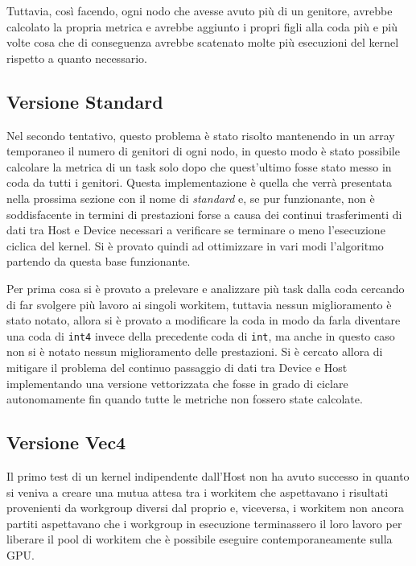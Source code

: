 \documentclass[../relazione.tex]{subfiles}
\begin{document}
Tuttavia, così facendo, ogni nodo che avesse avuto più di un genitore, avrebbe calcolato la propria metrica e avrebbe aggiunto i propri figli alla coda più e più volte cosa che di conseguenza avrebbe scatenato molte più esecuzioni del kernel rispetto a quanto necessario.

\subsection{Versione Standard}
Nel secondo tentativo, questo problema è stato risolto mantenendo in un array temporaneo il numero di genitori di ogni nodo, in questo modo è stato possibile calcolare la metrica di un task solo dopo che quest'ultimo fosse stato messo in coda da tutti i genitori. Questa implementazione è quella che verrà presentata nella prossima sezione con il nome di \textit{standard} e, se pur funzionante, non è soddisfacente in termini di prestazioni forse a causa dei continui trasferimenti di dati tra Host e Device necessari a verificare se terminare o meno l'esecuzione ciclica del kernel. Si è provato quindi ad ottimizzare in vari modi l'algoritmo partendo da questa base funzionante.

Per prima cosa si è provato a prelevare e analizzare più task dalla coda cercando di far svolgere più lavoro ai singoli workitem, tuttavia nessun miglioramento è stato notato, allora si è provato a modificare la coda in modo da farla diventare una coda di \lstinline{int4} invece della precedente coda di \lstinline{int}, ma anche in questo caso non si è notato nessun miglioramento delle prestazioni. Si è cercato allora di mitigare il problema del continuo passaggio di dati tra Device e Host implementando una versione vettorizzata che fosse in grado di ciclare autonomamente fin quando tutte le metriche non fossero state calcolate.

\subsection{Versione Vec4}
Il primo test di un kernel indipendente dall'Host non ha avuto successo in quanto si veniva a creare una mutua attesa tra i workitem che aspettavano i risultati provenienti da workgroup diversi dal proprio e, viceversa, i workitem non ancora partiti aspettavano che i workgroup in esecuzione terminassero il loro lavoro per liberare il pool di workitem che è possibile eseguire contemporaneamente sulla GPU.

\end{document}
